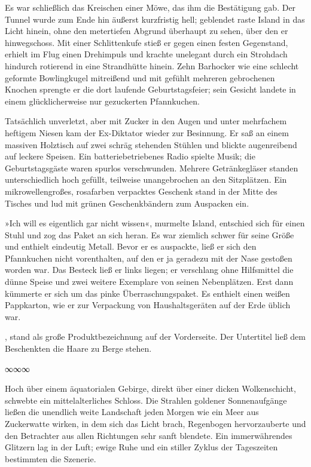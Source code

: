Es war schließlich das Kreischen einer Möwe, das ihm die Bestätigung gab. Der Tunnel wurde zum Ende hin äußerst kurzfristig hell; geblendet raste Island in das Licht hinein, ohne den metertiefen Abgrund überhaupt zu sehen, über den er hinwegschoss. Mit einer Schlittenkufe stieß er gegen einen festen Gegenstand, erhielt im Flug einen Drehimpuls und krachte unelegant durch ein Strohdach hindurch rotierend in eine Strandhütte hinein. Zehn Barhocker wie eine schlecht geformte Bowlingkugel mitreißend und mit gefühlt mehreren gebrochenen Knochen sprengte er die dort laufende Geburtstagsfeier; sein Gesicht landete in einem glücklicherweise nur gezuckerten Pfannkuchen.

Tatsächlich unverletzt, aber mit Zucker in den Augen und unter mehrfachem heftigem Niesen kam der Ex-Diktator wieder zur Besinnung. Er saß an einem massiven Holztisch auf zwei schräg stehenden Stühlen und blickte augenreibend auf leckere Speisen. Ein batteriebetriebenes Radio spielte Musik; die Geburtstagsgäste waren spurlos verschwunden. Mehrere Getränkegläser standen unterschiedlich hoch gefüllt, teilweise unangebrochen an den Sitzplätzen. Ein mikrowellengroßes, rosafarben verpacktes Geschenk stand in der Mitte des Tisches und lud mit grünen Geschenkbändern zum Auspacken ein.

»Ich will es eigentlich gar nicht wissen«, murmelte Island, entschied sich für einen Stuhl und zog das Paket an sich heran. Es war ziemlich schwer für seine Größe und enthielt eindeutig Metall. Bevor er es auspackte, ließ er sich den Pfannkuchen nicht vorenthalten, auf den er ja geradezu mit der Nase gestoßen worden war. Das Besteck ließ er links liegen; er verschlang ohne Hilfsmittel die dünne Speise und zwei weitere Exemplare von seinen Nebenplätzen. Erst dann kümmerte er sich um das pinke Überraschungspaket. Es enthielt einen weißen Pappkarton, wie er zur Verpackung von Haushaltsgeräten auf der Erde üblich war.

, stand als große Produktbezeichnung auf der Vorderseite. Der Untertitel ließ dem Beschenkten die Haare zu Berge stehen. 

\begin{center}
	∞∞∞
\end{center}

Hoch über einem äquatorialen Gebirge, direkt über einer dicken Wolkenschicht, schwebte ein mittelalterliches Schloss. Die Strahlen goldener Sonnenaufgänge ließen die unendlich weite Landschaft jeden Morgen wie ein Meer aus Zuckerwatte wirken, in dem sich das Licht brach, Regenbogen hervorzauberte und den Betrachter aus allen Richtungen sehr sanft blendete. Ein immerwährendes Glitzern lag in der Luft; ewige Ruhe und ein stiller Zyklus der Tageszeiten bestimmten die Szenerie.

